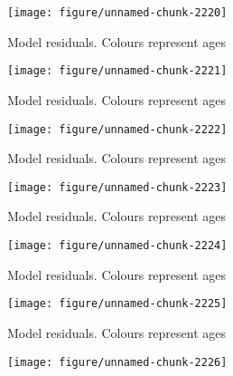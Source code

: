 \documentclass[a4paper]{article}\usepackage{graphicx, color}
\makeatletter
\def\maxwidth{ %
  \ifdim\Gin@nat@width>\linewidth
    \linewidth
  \else
    \Gin@nat@width
  \fi
}
\newenvironment{knitrout}{}{} %
\makeatother
\begin{document}
\begin{knitrout}
\begin{figure}[H]
{\centering \texttt{[image: figure/unnamed-chunk-2220]} 

}

\caption[Model residuals]{Model residuals. Colours represent ages\label{fig:unnamed-chunk-2220}}
\end{figure}
\begin{figure}[H]


{\centering \texttt{[image: figure/unnamed-chunk-2221]} 

}

\caption[Model residuals]{Model residuals. Colours represent ages\label{fig:unnamed-chunk-2221}}
\end{figure}
\begin{figure}[H]


{\centering \texttt{[image: figure/unnamed-chunk-2222]} 

}

\caption[Model residuals]{Model residuals. Colours represent ages\label{fig:unnamed-chunk-2222}}
\end{figure}
\begin{figure}[H]


{\centering \texttt{[image: figure/unnamed-chunk-2223]} 

}

\caption[Model residuals]{Model residuals. Colours represent ages\label{fig:unnamed-chunk-2223}}
\end{figure}
\begin{figure}[H]


{\centering \texttt{[image: figure/unnamed-chunk-2224]} 

}

\caption[Model residuals]{Model residuals. Colours represent ages\label{fig:unnamed-chunk-2224}}
\end{figure}
\begin{figure}[H]


{\centering \texttt{[image: figure/unnamed-chunk-2225]} 

}

\caption[Model residuals]{Model residuals. Colours represent ages\label{fig:unnamed-chunk-2225}}
\end{figure}
\begin{figure}[H]


{\centering \texttt{[image: figure/unnamed-chunk-2226]} 

}


\end{figure}
\end{knitrout}
\end{document}
